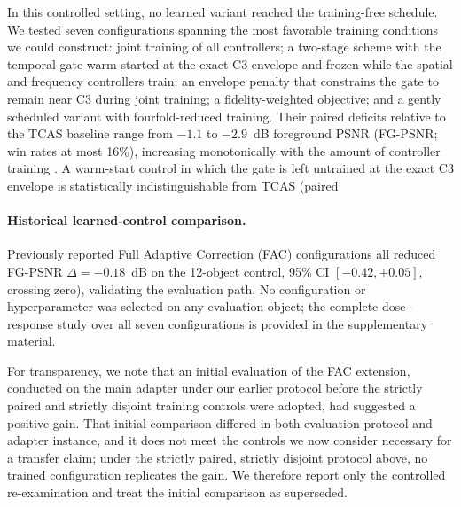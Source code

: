 \documentclass[times,twocolumn,final]{elsarticle}
\providecommand{\DIFadd}[1]{{\protect\color{blue} \sf #1}} %
\providecommand{\DIFdel}[1]{{\protect\color{red} \scriptsize #1}} %
\providecommand{\DIFaddbegin}{} %
\providecommand{\DIFaddend}{} %
\providecommand{\DIFdelbegin}{} %
\providecommand{\DIFdelend}{} %
\begin{document}
\DIFdelbegin \DIFdel{In this controlled setting, no learned variant reached the training-free schedule. We tested seven configurations spanning the most favorable training conditions we could construct: joint training of all controllers; a two-stage scheme with the temporal gate warm-started at the exact C3 envelope and frozen while the spatial and frequency controllers train; an envelope penalty that constrains the gate to remain near C3 during joint training; a fidelity-weighted objective; and a gently scheduled variant with fourfold-reduced training. Their paired deficits relative to the TCAS baseline range from $-1.1$ to $-2.9$~dB foreground PSNR (FG-PSNR; win rates at most 16\%), increasing monotonically with the amount of controller training . A warm-start control in which the gate is left untrained at the exact C3 envelope is statistically indistinguishable from TCAS (paired }\DIFdelend \DIFaddbegin \paragraph{Historical learned-control comparison.}
\label{subsec:facreported}
\DIFadd{Previously reported Full Adaptive Correction (FAC) configurations all reduced }\DIFaddend FG-PSNR \DIFdelbegin \DIFdel{$\Delta=-0.18$~dB on the 12-object control, 95\% CI $[-0.42,+0.05]$, crossing zero), validating the evaluation path.
No configuration or hyperparameter was selected on any evaluation object; the complete dose--response study over all seven configurations is provided in the supplementary material.
}%

\DIFdel{For transparency, we note that an initial evaluation of the FAC extension, conducted on the main adapter under our earlier protocol before the strictly paired and strictly disjoint training controls were adopted, had suggested a positive gain. That initial comparison differed in both evaluation protocol and adapter instance, and it does not meet the controls we now consider necessary for a transfer claim; under the strictly paired, strictly disjoint protocol above, no trained configuration replicates the gain. We therefore report only the controlled re-examination and treat the initial comparison as superseded. }%
\end{document}
